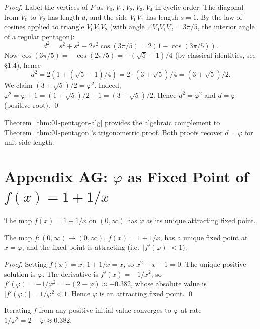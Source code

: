 \begin{proof}
Label the vertices of $P$ as $V_0, V_1, V_2, V_3, V_4$ in cyclic
order. The diagonal from $V_0$ to $V_2$ has length $d$, and the side
$V_0 V_1$ has length $s = 1$. By the law of cosines applied to
triangle $V_0 V_1 V_2$ (with angle $\angle V_0 V_1 V_2 = 3\pi/5$,
the interior angle of a regular pentagon):
\[
  d^2 = s^2 + s^2 - 2 s^2 \cos(3\pi/5) = 2 (1 - \cos(3\pi/5)).
\]
Now $\cos(3\pi/5) = -\cos(2\pi/5) = -(\sqrt 5 - 1)/4$ (by classical
identities, see \cite{coxeter_intro_geometry} \S 1.4), hence
\[
  d^2 = 2 (1 + (\sqrt 5 - 1)/4) = 2 \cdot (3 + \sqrt 5)/4 = (3 +
  \sqrt 5)/2.
\]
We claim $(3 + \sqrt 5)/2 = \varphi^2$. Indeed, $\varphi^2 = \varphi
+ 1 = (1 + \sqrt 5)/2 + 1 = (3 + \sqrt 5)/2$. Hence $d^2 = \varphi^2$
and $d = \varphi$ (positive root).
\qed
\end{proof}

\begin{remark}
Theorem~\ref{thm:01-pentagon-alg} provides the algebraic complement to
Theorem~\ref{thm:01-pentagon}'s trigonometric proof. Both proofs
recover $d = \varphi$ for unit side length.
\end{remark}

\section*{Appendix AG: $\varphi$ as Fixed Point of $f(x) = 1 + 1/x$}
\label{fa_01:sec:01-app-AG}

The map $f(x) = 1 + 1/x$ on $(0, \infty)$ has $\varphi$ as its unique
attracting fixed point.

\begin{theorem}\label{thm:01-fixed}
The map $f : (0, \infty) \to (0, \infty)$, $f(x) = 1 + 1/x$, has a
unique fixed point at $x = \varphi$, and the fixed point is
attracting (i.e.\ $|f'(\varphi)| < 1$).
\end{theorem}

\begin{proof}
Setting $f(x) = x$: $1 + 1/x = x$, so $x^2 - x - 1 = 0$. The unique
positive solution is $\varphi$. The derivative is $f'(x) = -1/x^2$,
so $f'(\varphi) = -1/\varphi^2 = -(2 - \varphi) \approx -0.382$,
whose absolute value is $|f'(\varphi)| = 1/\varphi^2 < 1$. Hence
$\varphi$ is an attracting fixed point.
\qed
\end{proof}

\begin{corollary}
\label{fa_01:cor:01-fp-rate}
Iterating $f$ from any positive initial value converges to $\varphi$
at rate $1/\varphi^2 = 2 - \varphi \approx 0.382$.
\end{corollary}

